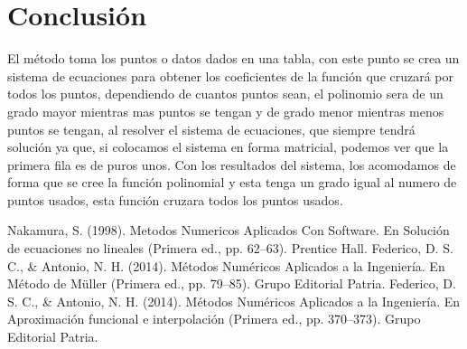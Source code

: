 \documentclass[12pt]{article}
\begin{document}
		\section*{\centering Conclusión}\label{sec:Conclusion}
			El método toma los puntos o datos dados en una tabla, con este punto se crea un sistema 
			de ecuaciones para obtener los coeficientes de la función que cruzará por todos los puntos, 
			dependiendo de cuantos puntos sean, el polinomio sera de un grado mayor mientras mas puntos 
			se tengan y de grado menor mientras menos puntos se tengan, al resolver el sistema de ecuaciones, 
			que siempre tendrá solución ya que, si colocamos el sistema en forma matricial, podemos ver que 
			la primera fila es de puros unos. Con los resultados del sistema, los acomodamos de forma que se 
			cree la función polinomial y esta tenga un grado igual al numero de puntos usados, esta función 
			cruzara todos los puntos usados.

		\centering
		\begin{thebibliography}{10}
			 Nakamura, S. (1998). Metodos Numericos Aplicados Con Software. En Solución de ecuaciones no lineales (Primera ed., pp. 62–63). Prentice Hall.
			 Federico, D. S. C., \& Antonio, N. H. (2014). Métodos Numéricos Aplicados a la Ingeniería. En Método de Müller (Primera ed., pp. 79–85). Grupo Editorial Patria.
			 Federico, D. S. C., \& Antonio, N. H. (2014). Métodos Numéricos Aplicados a la Ingeniería. En Aproximación funcional e interpolación (Primera ed., pp. 370–373). Grupo Editorial Patria.
		\end{thebibliography}

	
\end{document}

